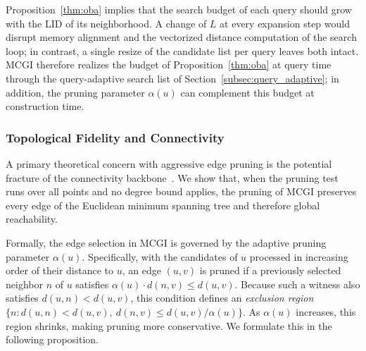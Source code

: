 \documentclass{article}
\theoremstyle{plain}
\theoremstyle{definition}
\theoremstyle{remark}
\newcommand{\ours}{MCGI\xspace}
\begin{document}
Proposition~\ref{thm:oba} implies that the search budget of each query should grow with the LID of its neighborhood. A change of $L$ at every expansion step would disrupt memory alignment and the vectorized distance computation of the search loop; in contrast, a single resize of the candidate list per query leaves both intact. \ours{} therefore realizes the budget of Proposition~\ref{thm:oba} at query time through the query-adaptive search list of Section~\ref{subsec:query_adaptive}; in addition, the pruning parameter $\alpha(u)$ can complement this budget at construction time.


\subsubsection{Topological Fidelity and Connectivity}
\label{subsec:connectivity}

A primary theoretical concern with aggressive edge pruning is the potential fracture of the connectivity backbone~\cite{dzhao_pami09}. We show that, when the pruning test runs over all points and no degree bound applies, the pruning of \ours{} preserves every edge of the Euclidean minimum spanning tree and therefore global reachability.

Formally, the edge selection in \ours{} is governed by the adaptive pruning parameter $\alpha(u)$. Specifically, with the candidates of $u$ processed in increasing order of their distance to $u$, an edge $(u, v)$ is pruned if a previously selected neighbor $n$ of $u$ satisfies $\alpha(u) \cdot d(n, v) \le d(u, v)$.
Because such a witness also satisfies $d(u, n) < d(u, v)$, this condition defines an \textit{exclusion region} $\{n : d(u,n) < d(u,v),\ d(n,v) \le d(u,v)/\alpha(u)\}$. As $\alpha(u)$ increases, this region shrinks, making pruning more conservative. We formulate this in the following proposition.
\end{document}

